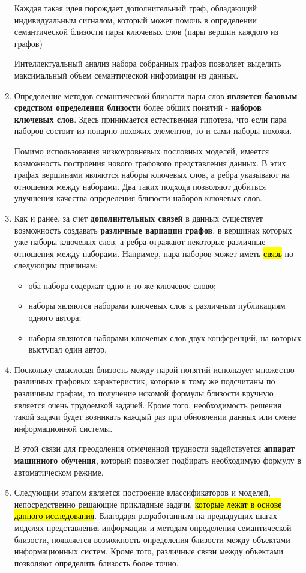 \begin{enumerate}
        Каждая такая идея порождает дополнительный граф, обладающий индивидуальным сигналом, который может помочь в определении семантической близости пары ключевых слов (пары вершин каждого из графов)

        Интеллектуальный анализ набора собранных графов позволяет выделить максимальный объем семантической информации из данных.

    \item Определение методов семантической близости пары слов \textbf{является базовым средством определения близости} более общих понятий - \textbf{наборов ключевых слов}. Здесь принимается естественная гипотеза, что если пара наборов состоит из попарно похожих элементов, то и сами наборы похожи. 
        
            Помимо использования низкоуровневых пословных моделей, имеется возможность построения нового графового представления данных. В этих графах вершинами являются наборы ключевых слов, а ребра указывают на отношения между наборами. Два таких подхода позволяют добиться улучшения качества определения близости наборов ключевых слов.

        \item Как и ранее, за счет \textbf{дополнительных связей} в данных существует возможность создавать \textbf{различные вариации графов}, в вершинах которых уже наборы ключевых слов, а ребра отражают некоторые различные отношения между наборами. Например, пара наборов может иметь \hl{связь} по следующим причинам:
        \begin{itemize}
            \item оба набора содержат одно и то же ключевое слово;
            \item наборы являются наборами ключевых слов к различным публикациям одного автора;
            \item наборы являются наборами ключевых слов двух конференций, на которых выступал один автор.
        \end{itemize}
    \item Поскольку смысловая близость между парой понятий использует множество различных графовых характеристик, которые к тому же подсчитаны по различным графам, то получение искомой формулы близости вручную является очень трудоемкой задачей. Кроме того, необходимость решения такой задачи будет возникать каждый раз при обновлении данных или смене информационной системы.

        В этой связи для преодоления отмеченной трудности задействуется \textbf{аппарат машинного обучения}, который позволяет подбирать необходимую формулу в автоматическом режиме.

    \item Следующим этапом является построение классификаторов и моделей, непосредственно решающие прикладные задачи, \hl{которые лежат в основе данного исследования}. Благодаря разработанным на предыдущих шагах моделях представления информации и методам определения семантической близости, появляется возможность определения близости между объектами информационных систем. Кроме того, различные связи между объектами позволяют определить близость более точно.
\end{enumerate}
